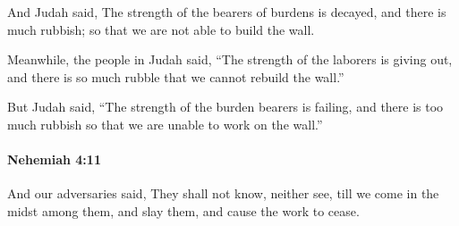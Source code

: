 			\begin{versebox}
					\item[BHS] 
					\item[LXX] 
					\item[ASV] And Judah said, The strength of the bearers of burdens is decayed, and there is much rubbish; so that we are not able to build the wall.
					\item[NIV] Meanwhile, the people in Judah said, “The strength of the laborers is giving out, and there is so much rubble that we cannot rebuild the wall.”
					\item[NRSV] But Judah said, “The strength of the burden bearers is failing, and there is too much rubbish so that we are unable to work on the wall.”
			\end{versebox}

		\paragraph{Nehemiah 4:11} %
			\label{NEHEMIAH-4-11}

			And our adversaries said, They shall not know, neither see, till we come in the midst among them, and slay them, and cause the work to cease.

